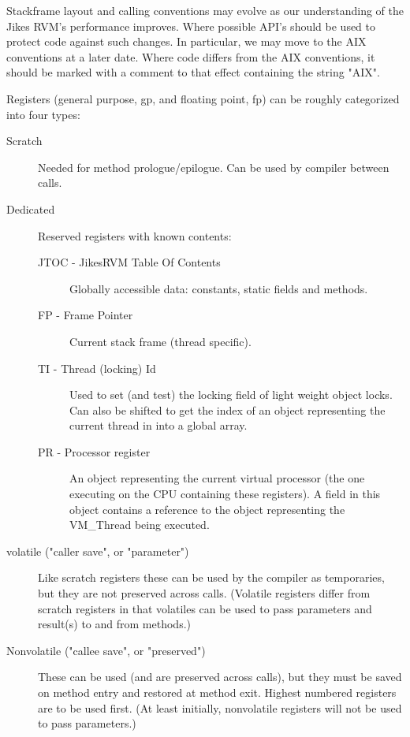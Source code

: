 Stackframe layout and calling conventions may evolve as our understanding
of the Jikes RVM's performance improves.  Where possible API's should be used
to protect code against such changes.  In particular, we may move to
the AIX conventions at a later date.  Where code differs from the AIX
conventions, it should be marked with a comment to that effect containing
the string "AIX".


Registers (general purpose, gp, and floating point, fp) can be roughly
categorized into four types:

\begin{description}
\item [Scratch]
     Needed for method prologue/epilogue.  Can be used by compiler between
     calls.

\item[Dedicated]
     Reserved registers with known contents:
\begin{description}
\item [JTOC - JikesRVM Table Of Contents]
        Globally accessible data: constants, static fields and methods.

\item [FP - Frame Pointer]
        Current stack frame (thread specific).

\item [TI - Thread (locking) Id]
        Used to set (and test) the locking field of light weight object
        locks.  Can also be shifted to get the index of an object
        representing the current thread in into a global array.

\item [PR - Processor register]
        An object representing the current virtual processor (the one
        executing on the CPU containing these registers).  A field in
        this object contains a reference to the object representing
        the VM\_Thread being executed.
\end{description}

\item [volatile ("caller save", or "parameter")]
     Like scratch registers these can be used by the compiler as
     temporaries, but they are not preserved across calls.  (Volatile
     registers differ from scratch registers in that volatiles
     can be used to pass parameters and result(s) to and from
     methods.)

\item [Nonvolatile ("callee save", or "preserved")]
     These can be used (and are preserved across calls), but they must be
     saved on method entry and restored at method exit.  Highest numbered
     registers are to be used first.  (At least initially, nonvolatile
     registers will not be used to pass parameters.)


\end{description}
